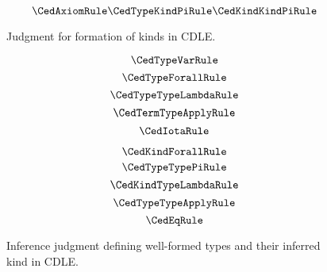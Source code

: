 
\begin{figure}
    \centering
    $$\CedAxiomRule \CedTypeKindPiRule \CedKindKindPiRule$$
    \caption{
        Judgment for formation of kinds in CDLE.
    }
    \label{fig:4:kind}
\end{figure}


\begin{figure}
    \centering
    \begin{minipage}{0.5\textwidth}
        $$\CedTypeVarRule$$
        $$\CedTypeForallRule$$
        $$\CedTypeTypeLambdaRule$$
        $$\CedTermTypeApplyRule$$
        $$\CedIotaRule$$
    \end{minipage}%
    \begin{minipage}{0.5\textwidth}
        $$\CedKindForallRule$$
        $$\CedTypeTypePiRule$$
        $$\CedKindTypeLambdaRule$$
        $$\CedTypeTypeApplyRule$$
        $$\CedEqRule$$
    \end{minipage}%
    \caption{
        Inference judgment defining well-formed types and their inferred kind in CDLE.
    }
    \label{fig:4:type}
\end{figure}
